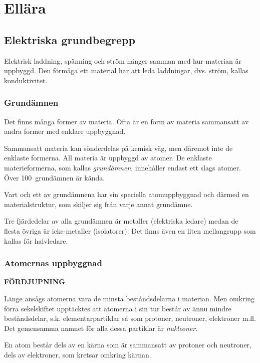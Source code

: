 \chapter{Ellära}
\label{ellära}

\section{Elektriska grundbegrepp}


Elektrisk laddning, spänning och ström hänger samman med hur materian är
uppbyggd.
Den förmåga ett material har att leda laddningar, dvs. ström, kallas
konduktivitet.

\subsection{Grundämnen}

Det finns många former av materia.
Ofta är en form av materia sammansatt av andra former med enklare uppbyggnad.

Sammansatt materia kan sönderdelas på kemisk väg, men däremot inte de enklaste
formerna.
All materia är uppbyggd av atomer.
De enklaste materieformerna, som kallas \emph{grundämnen}, innehåller endast
ett slags atomer.
Över 100~grundämnen är kända.

Vart och ett av grundämnena har sin speciella atomuppbyggnad och därmed en
materialstruktur, som skiljer sig från varje annat grundämne.

Tre fjärdedelar av alla grundämnen är metaller (elektriska ledare) medan de
flesta övriga är icke-metaller (isolatorer).
Det finns även en liten mellangrupp som kallas för halvledare.

\subsection{Atomernas uppbyggnad}
\textbf{FÖRDJUPNING}

Länge ansågs atomerna vara de minsta beståndsdelarna i materian.
Men omkring förra sekelskiftet upptäcktes att atomerna i sin tur består av ännu mindre
beståndsdelar, s.k. elementarpartiklar så som protoner, neutroner, elektroner
m.fl.
Det gemensamma namnet för alla dessa partiklar är \emph{nukleoner}.

En atom består dels av en kärna som är sammansatt av protoner och neutroner,
dels av elektroner, som kretsar omkring kärnan.

